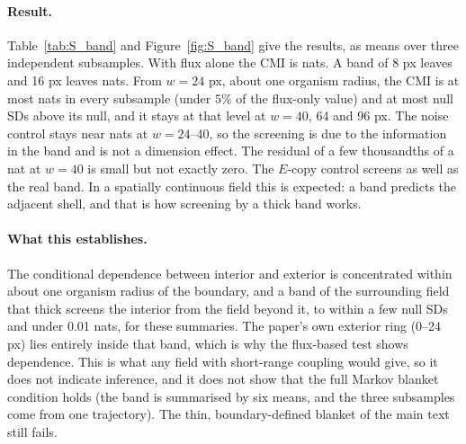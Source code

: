 \documentclass[11pt]{article}
\begin{document}
\paragraph{Result.} Table~\ref{tab:S_band} and Figure~\ref{fig:S_band} give the results, as means over three independent subsamples. With flux alone the CMI is  nats. A band of 8 px leaves  and 16 px leaves  nats. From $w=24$ px, about one organism radius, the CMI is at most  nats in every subsample (under $5\%$ of the flux-only value) and at most  null SDs above its null, and it stays at that level at $w=40$, 64 and 96 px. The noise control stays near  nats at $w=24$--40, so the screening is due to the information in the band and is not a dimension effect. The residual of a few thousandths of a nat at $w=40$ is small but not exactly zero. The $E$-copy control screens as well as the real band. In a spatially continuous field this is expected: a band predicts the adjacent shell, and that is how screening by a thick band works.

\paragraph{What this establishes.} The conditional dependence between interior and exterior is concentrated within about one organism radius of the boundary, and a band of the surrounding field that thick screens the interior from the field beyond it, to within a few null SDs and under 0.01 nats, for these summaries. The paper's own exterior ring (0--24 px) lies entirely inside that band, which is why the flux-based test shows dependence. This is what any field with short-range coupling would give, so it does not indicate inference, and it does not show that the full Markov blanket condition holds (the band is summarised by six means, and the three subsamples come from one trajectory). The thin, boundary-defined blanket of the main text still fails.
\end{document}
